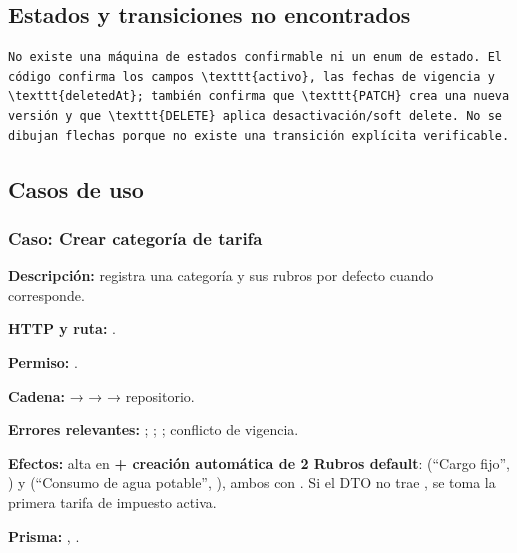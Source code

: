 \subsection{Estados y transiciones no encontrados}


\begin{lstlisting}
No existe una máquina de estados confirmable ni un enum de estado. El código confirma los campos \texttt{activo}, las fechas de vigencia y \texttt{deletedAt}; también confirma que \texttt{PATCH} crea una nueva versión y que \texttt{DELETE} aplica desactivación/soft delete. No se dibujan flechas porque no existe una transición explícita verificable.
\end{lstlisting}


\subsection{Casos de uso}


\subsubsection{Caso: Crear categoría de tarifa}


\textbf{Descripción:} registra una categoría y sus rubros por defecto cuando corresponde.  

\textbf{HTTP y ruta:} \texttt{}.  

\textbf{Permiso:} \texttt{}.  

\textbf{Cadena:} \texttt{} → \texttt{} → \texttt{} → repositorio.  

\textbf{Errores relevantes:} \texttt{}; \texttt{}; \texttt{}; conflicto de vigencia.  

\textbf{Efectos:} alta en \texttt{} \textbf{+ creación automática de 2 Rubros default}: \texttt{} (``Cargo fijo'', \texttt{}) y \texttt{} (``Consumo de agua potable'', \texttt{}), ambos con \texttt{}. Si el DTO no trae \texttt{}, se toma la primera tarifa de impuesto activa.

\textbf{Prisma:} \texttt{}, \texttt{}.  

